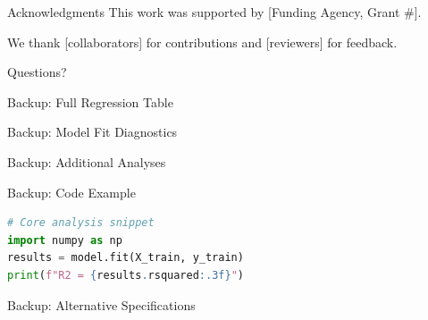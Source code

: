 \documentclass[aspectratio=169,11pt]{beamer}
\begin{document}
\begin{frame}{Acknowledgments}
  \small
  This work was supported by [Funding Agency, Grant \#].

  We thank [collaborators] for contributions and [reviewers] for feedback.

\end{frame}

\begin{frame}[standout]
  Questions?
\end{frame}

\appendix

\begin{frame}{Backup: Full Regression Table}
\end{frame}

\begin{frame}{Backup: Model Fit Diagnostics}
\end{frame}

\begin{frame}{Backup: Additional Analyses}
\end{frame}

\begin{frame}{Backup: Code Example}
  \begin{lstlisting}[language=Python]
# Core analysis snippet
import numpy as np
results = model.fit(X_train, y_train)
print(f"R2 = {results.rsquared:.3f}")
  \end{lstlisting}
\end{frame}

\begin{frame}{Backup: Alternative Specifications}
\end{frame}
\end{document}
